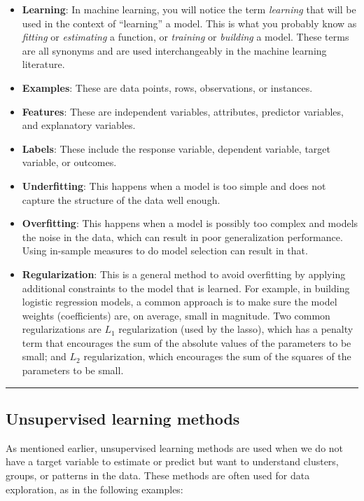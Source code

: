 \documentclass[]{krantz}
\begin{document}
\begin{itemize}
\item
  \textbf{Learning}: In machine learning, you will notice the term
  \emph{learning} that will be used in the context of ``learning'' a
  model. This is what you probably know as \emph{fitting} or
  \emph{estimating} a function, or \emph{training} or \emph{building} a
  model. These terms are all synonyms and are used interchangeably in
  the machine learning literature.
\item
  \textbf{Examples}: These are data points, rows, observations, or
  instances.
\item
  \textbf{Features}: These are independent variables, attributes,
  predictor variables, and explanatory variables.
\item
  \textbf{Labels}: These include the response variable, dependent
  variable, target variable, or outcomes.
\item
  \textbf{Underfitting}: This happens when a model is too simple and
  does not capture the structure of the data well enough.
\item
  \textbf{Overfitting}: This happens when a model is possibly too
  complex and models the noise in the data, which can result in poor
  generalization performance. Using in-sample measures to do model
  selection can result in that.
\item
  \textbf{Regularization}: This is a general method to avoid overfitting
  by applying additional constraints to the model that is learned. For
  example, in building logistic regression models, a common approach is
  to make sure the model weights (coefficients) are, on average, small
  in magnitude. Two common regularizations are \(L_1\) regularization
  (used by the lasso), which has a penalty term that encourages the sum
  of the absolute values of the parameters to be small; and \(L_2\)
  regularization, which encourages the sum of the squares of the
  parameters to be small.
\end{itemize}

\begin{center}\rule{0.5\linewidth}{\linethickness}\end{center}

\subsection{Unsupervised learning
methods}\label{unsupervised-learning-methods}

As mentioned earlier, unsupervised learning methods are used when we do
not have a target variable to estimate or predict but want to understand
clusters, groups, or patterns in the data. These methods are often used
for data exploration, as in the following examples:
\end{document}
